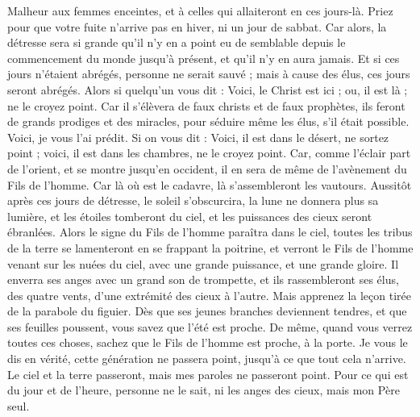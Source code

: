 \begin{multicols}{2}
Malheur aux femmes enceintes, et à celles qui allaiteront en ces jours-là.
Priez pour que votre fuite n'arrive pas en hiver, ni un jour de sabbat.
Car alors, la détresse sera si grande qu'il n'y en a point eu de semblable depuis le commencement du monde jusqu'à présent, et qu'il n'y en aura jamais.
Et si ces jours n'étaient abrégés, personne ne serait sauvé ; mais à cause des élus, ces jours seront abrégés.
Alors si quelqu'un vous dit : Voici, le Christ est ici ; ou, il est là ; ne le croyez point.
Car il s'élèvera de faux christs et de faux prophètes, ils feront de grands prodiges et des miracles, pour séduire même les élus, s'il était possible.
Voici, je vous l'ai prédit.
Si on vous dit : Voici, il est dans le désert, ne sortez point ; voici, il est dans les chambres, ne le croyez point.
Car, comme l'éclair part de l'orient, et se montre jusqu'en occident, il en sera de même de l'avènement du Fils de l'homme.
Car là où est le cadavre, là s'assembleront les vautours.
Aussitôt après ces jours de détresse, le soleil s'obscurcira, la lune ne donnera plus sa lumière, et les étoiles tomberont du ciel, et les puissances des cieux seront ébranlées.
Alors le signe du Fils de l'homme paraîtra dans le ciel, toutes les tribus de la terre se lamenteront en se frappant la poitrine, et verront le Fils de l'homme venant sur les nuées du ciel, avec une grande puissance, et une grande gloire.
Il enverra ses anges avec un grand son de trompette, et ils rassembleront ses élus, des quatre vents, d'une extrémité des cieux à l'autre.
Mais apprenez la leçon tirée de la parabole du figuier. Dès que ses jeunes branches deviennent tendres, et que ses feuilles poussent, vous savez que l'été est proche.
De même, quand vous verrez toutes ces choses, sachez que le Fils de l'homme est proche, à la porte.
Je vous le dis en vérité, cette génération ne passera point, jusqu'à ce que tout cela n'arrive.
Le ciel et la terre passeront, mais mes paroles ne passeront point.
Pour ce qui est du jour et de l'heure, personne ne le sait, ni les anges des cieux, mais mon Père seul.

\end{multicols}

